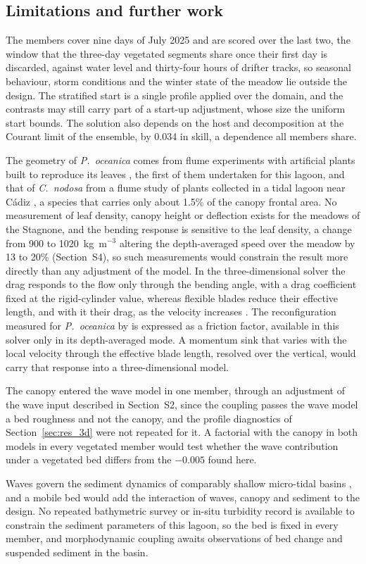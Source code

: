 \subsection{Limitations and further work}
\label{sec:disc_limits}

The members cover nine days of July 2025 and are scored over the last two,
the window that the three-day vegetated segments share once their first day is
discarded, against water level and thirty-four hours of drifter tracks, so
seasonal behaviour, storm conditions and the winter state of the meadow lie
outside the design. The stratified start is a single profile applied
over the domain, and the contrasts may still carry part of a start-up
adjustment, whose size the uniform start bounds. The solution also depends on
the host and decomposition at the Courant limit of the ensemble, by 0.034 in
skill, a dependence all members share.

The geometry of \emph{P.\ oceanica} comes from flume experiments with
artificial plants built to reproduce its leaves \citep{CiraoloFerreri2006,
Prinos2010}, the first of them undertaken for this lagoon, and that of
\emph{C.\ nodosa} from a flume study of plants collected in a tidal lagoon
near C\'adiz \citep{Morris2008}, a species that carries only about 1.5\% of
the canopy frontal area. No measurement of leaf density, canopy height or
deflection exists for the meadows of the Stagnone, and the bending response
is sensitive to the leaf density, a change from 900 to 1020~kg~m$^{-3}$
altering the depth-averaged speed over the meadow by 13 to 20\%
(Section~S4), so such measurements would constrain the result more directly
than any adjustment of the model. In the three-dimensional solver the drag responds to
the flow only through the bending angle, with a drag coefficient fixed at the
rigid-cylinder value, whereas flexible blades reduce their effective length,
and with it their drag, as the velocity increases \citep{LuharNepf2011}. The
reconfiguration measured for \emph{P.\ oceanica} by \citet{CiraoloFerreri2006}
is expressed as a friction factor, available in this solver only in its
depth-averaged mode. A momentum sink that varies with the local velocity
through the effective blade length, resolved over the vertical, would carry
that response into a three-dimensional model.

The canopy entered the wave model in one member, through an adjustment of the
wave input described in Section~S2, since the coupling passes the wave model a
bed roughness and not the canopy, and the profile diagnostics of
Section~\ref{sec:res_3d} were not repeated for it. A factorial with the canopy
in both models in every vegetated member would test whether the wave
contribution under a vegetated bed differs from the $-0.005$ found here.

Waves govern the sediment dynamics of comparably shallow micro-tidal basins
\citep{Carniello2011}, and a mobile bed would add the interaction of waves,
canopy and sediment to the design. No repeated bathymetric survey or in-situ
turbidity record is available to constrain the sediment parameters of this
lagoon, so the bed is fixed in every member, and morphodynamic coupling awaits
observations of bed change and suspended sediment in the basin.
